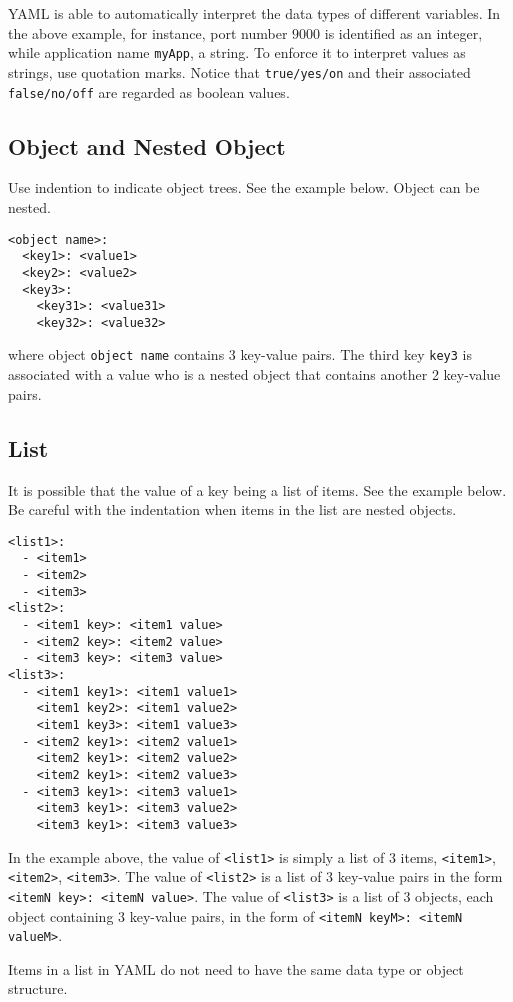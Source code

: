 YAML is able to automatically interpret the data types of different variables. In the above example, for instance, port number $9000$ is identified as an integer, while application name \verb|myApp|, a string. To enforce it to interpret values as strings, use quotation marks. Notice that \verb|true/yes/on| and their associated \verb|false/no/off| are regarded as boolean values.


\subsection{Object and Nested Object}

Use indention to indicate object trees. See the example below. Object can be nested.
\begin{lstlisting}
<object name>:
  <key1>: <value1>
  <key2>: <value2>
  <key3>:
    <key31>: <value31>
    <key32>: <value32>
\end{lstlisting}
where object \verb|object name| contains 3 key-value pairs. The third key \verb|key3| is associated with a value who is a nested object that contains another 2 key-value pairs.

\subsection{List}

It is possible that the value of a key being a list of items. See the example below. Be careful with the indentation when items in the list are nested objects.
\begin{lstlisting}
<list1>:
  - <item1>
  - <item2>
  - <item3>
<list2>:
  - <item1 key>: <item1 value>
  - <item2 key>: <item2 value>
  - <item3 key>: <item3 value>
<list3>:
  - <item1 key1>: <item1 value1>
    <item1 key2>: <item1 value2>
    <item1 key3>: <item1 value3>
  - <item2 key1>: <item2 value1>
    <item2 key1>: <item2 value2>
    <item2 key1>: <item2 value3>
  - <item3 key1>: <item3 value1>
    <item3 key1>: <item3 value2>
    <item3 key1>: <item3 value3>
\end{lstlisting}
In the example above, the value of \verb|<list1>| is simply a list of 3 items, \verb|<item1>|, \verb|<item2>|, \verb|<item3>|. The value of \verb|<list2>| is a list of 3 key-value pairs in the form \verb|<itemN key>: <itemN value>|. The value of \verb|<list3>| is a list of 3 objects, each object containing 3 key-value pairs, in the form of \verb|<itemN keyM>: <itemN valueM>|.

Items in a list in YAML do not need to have the same data type or object structure.

